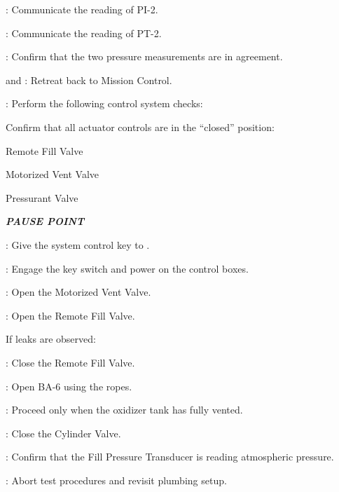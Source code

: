 \begin{checklist}
\begin{checklist}[label=$\bullet$]
    \end{checklist}
    \item \primary{}: Communicate the reading of PI-2.
    \item \daq{}: Communicate the reading of PT-2.
    \item \daq{}: Confirm that the two pressure measurements are in agreement.
    \item \primary{} and \secondary{}: Retreat back to Mission Control.
    \item \control{}: Perform the following control system checks:
    \begin{checklist}
        \item Confirm that all actuator controls are in the ``closed'' position:
        \begin{checklist}
            \item Remote Fill Valve
            \item Motorized Vent Valve
            \item Pressurant Valve
        \end{checklist}
    \end{checklist}
    \item \textbf{\textit{PAUSE POINT}}
    \item \ops: Give the system control key to \control{}.
    \item \control{}: Engage the key switch and power on the control boxes.
    \item \control{}: Open the Motorized Vent Valve.
    \item \control{}: Open the Remote Fill Valve.
    \begin{checklist}[label=$\bullet$]
        \item If leaks are observed:
        \begin{checklist}
            \item \control{}: Close the Remote Fill Valve.
            \item \primary{}: Open BA-6 using the ropes.
            \item \ops: Proceed only when the oxidizer tank has fully vented.
            \item \primary{}: Close the Cylinder Valve.
            \item \daq{}: Confirm that the Fill Pressure Transducer is reading atmospheric pressure.
            \item \ops{}: Abort test procedures and revisit plumbing setup.
        \end{checklist}

\end{checklist}
\end{checklist}
